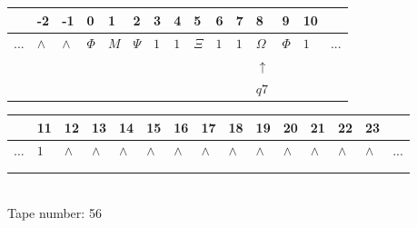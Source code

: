 \documentclass[11pt]{article}
\begin{document}
\begin{table}[H]
\centering
\begin{tabular}{lllllllllllllll}
 & -2 & -1 & 0 & 1 & 2 & 3 & 4 & 5 & 6 & 7 & 8 & 9 & 10 & \\
\hline
$...$ & \multicolumn{1}{|l|}{$\wedge$} & \multicolumn{1}{|l|}{$\wedge$} & \multicolumn{1}{|l|}{$\Phi$} & \multicolumn{1}{|l|}{$M$} & \multicolumn{1}{|l|}{$\Psi$} & \multicolumn{1}{|l|}{$1$} & \multicolumn{1}{|l|}{$1$} & \multicolumn{1}{|l|}{$\Xi$} & \multicolumn{1}{|l|}{$1$} & \multicolumn{1}{|l|}{$1$} & \multicolumn{1}{|l|}{$\Omega$} & \multicolumn{1}{|l|}{$\Phi$} & \multicolumn{1}{|l|}{$1$} & $...$\\
\hline
&  &  &  &  &  &  &  &  &  &  & $\uparrow$ &  &  &  \\
&  &  &  &  &  &  &  &  &  &  & $ q7 $ &  &  &  \\
\end{tabular}
\begin{tabular}{lllllllllllllll}
 & 11 & 12 & 13 & 14 & 15 & 16 & 17 & 18 & 19 & 20 & 21 & 22 & 23 & \\
\hline
$...$ & \multicolumn{1}{|l|}{$1$} & \multicolumn{1}{|l|}{$\wedge$} & \multicolumn{1}{|l|}{$\wedge$} & \multicolumn{1}{|l|}{$\wedge$} & \multicolumn{1}{|l|}{$\wedge$} & \multicolumn{1}{|l|}{$\wedge$} & \multicolumn{1}{|l|}{$\wedge$} & \multicolumn{1}{|l|}{$\wedge$} & \multicolumn{1}{|l|}{$\wedge$} & \multicolumn{1}{|l|}{$\wedge$} & \multicolumn{1}{|l|}{$\wedge$} & \multicolumn{1}{|l|}{$\wedge$} & \multicolumn{1}{|l|}{$\wedge$} & $...$\\
\hline
&  &  &  &  &  &  &  &  &  &  &  &  &  &  \\
&  &  &  &  &  &  &  &  &  &  &  &  &  &  \\
\end{tabular}
\\
Tape number: 56
\noindent\makebox[\linewidth]{\hdashrule{\textwidth}{1pt}{1pt}}\end{table}
\end{document}
